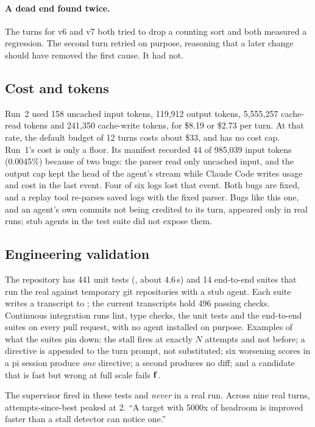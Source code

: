 \paragraph{A dead end found twice.} The turns for v6 and v7 both tried to drop a counting sort and
both measured a regression. The second turn retried on purpose, reasoning that a later change should
have removed the first cause. It had not.

\subsection{Cost and tokens}
\label{sec:eval-cost}

Run~2 used 158 uncached input tokens, 119{,}912 output tokens, 5{,}555{,}257 cache-read tokens and
241{,}350 cache-write tokens, for \$8.19 or \$2.73 per turn. At that rate, the default budget of
12 turns costs about \$33, and  has no cost cap. Run~1's cost is only a floor. Its
manifest recorded 44 of 985{,}039 input tokens (0.0045\%) because of two bugs: the parser read only
uncached input, and the output cap kept the head of the agent's stream while Claude Code writes usage
and cost in the last event. Four of six logs lost that event. Both bugs are fixed, and a replay tool
re-parses saved logs with the fixed parser. Bugs like this one, and an agent's own commits not being
credited to its turn, appeared only in real runs; stub agents in the test suite did not expose them.

\subsection{Engineering validation}

The repository has 441 unit tests (, about 4.6\,s) and 14 end-to-end suites that run
the real  against temporary git repositories with a stub agent. Each suite writes a
transcript to ; the current transcripts hold 496 passing checks. Continuous
integration runs lint, type checks, the unit tests and the end-to-end suites on every pull request,
with no agent installed on purpose. Examples of what the suites pin down: the stall fires at exactly
$N$ attempts and not before; a directive is appended to the turn prompt, not substituted; six
worsening scores in a pi session produce \emph{one} directive; a second  produces no
diff; and a candidate that is fast but wrong at full scale fails $\mathbf{f}$.

The supervisor fired in these tests and \emph{never} in a real run. Across nine real turns,
attempts-since-best peaked at 2. ``A target with 5000x of headroom is improved faster than a stall
detector can notice one.''

